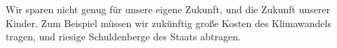 Wir sparen nicht genug für unsere eigene Zukunft, und die Zukunft unserer Kinder.
Zum Beispiel müssen wir zukünftig große Kosten des Klimawandels tragen, und riesige Schuldenberge des Staats abtragen.